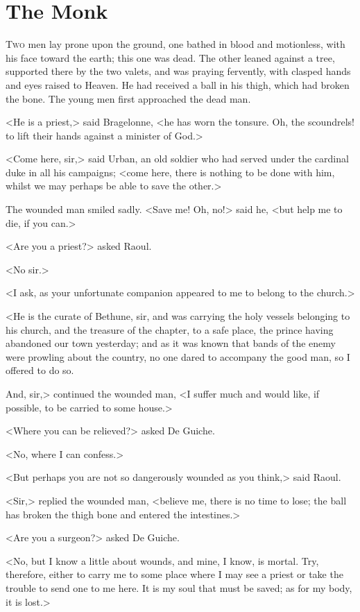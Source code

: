 \chapter{The Monk}

 \lettrine{T}{wo} men lay prone upon the ground, one bathed in blood and motionless, with his face toward the earth; this one was dead. The other leaned against a tree, supported there by the two valets, and was praying fervently, with clasped hands and eyes raised to Heaven. He had received a ball in his thigh, which had broken the bone. The young men first approached the dead man.

<He is a priest,> said Bragelonne, <he has worn the tonsure. Oh, the scoundrels! to lift their hands against a minister of God.>

<Come here, sir,> said Urban, an old soldier who had served under the cardinal duke in all his campaigns; <come here, there is nothing to be done with him, whilst we may perhaps be able to save the other.>

The wounded man smiled sadly. <Save me! Oh, no!> said he, <but help me to die, if you can.>

<Are you a priest?> asked Raoul.

<No sir.>

<I ask, as your unfortunate companion appeared to me to belong to the church.>

<He is the curate of Bethune, sir, and was carrying the holy vessels belonging to his church, and the treasure of the chapter, to a safe place, the prince having abandoned our town yesterday; and as it was known that bands of the enemy were prowling about the country, no one dared to accompany the good man, so I offered to do so.

And, sir,> continued the wounded man, <I suffer much and would like, if possible, to be carried to some house.>

<Where you can be relieved?> asked De Guiche.

<No, where I can confess.>

<But perhaps you are not so dangerously wounded as you think,> said Raoul.

<Sir,> replied the wounded man, <believe me, there is no time to lose; the ball has broken the thigh bone and entered the intestines.>

<Are you a surgeon?> asked De Guiche.

<No, but I know a little about wounds, and mine, I know, is mortal. Try, therefore, either to carry me to some place where I may see a priest or take the trouble to send one to me here. It is my soul that must be saved; as for my body, it is lost.>

